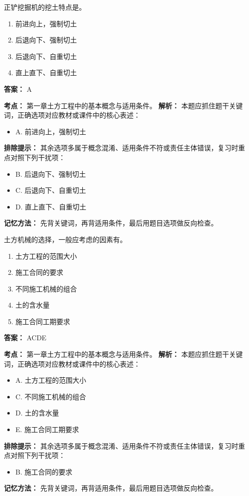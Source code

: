 \documentclass[UTF8,fontset=fandol,11pt]{ctexart}
\begin{document}
\begin{quizbox}[title={第 6 题}]
正铲挖掘机的挖土特点是。\\
\begin{enumerate}[label=\Alph*.]
\item 前进向上，强制切土
\item 后退向下、强制切土
\item 后退向下、自重切土
\item 直上直下、自重切土
\end{enumerate}
\textbf{答案：} A
\vspace{0.25em}
\begin{answerbox}[title={考点解析}]
\textbf{考点：} 第一章土方工程中的基本概念与适用条件。
\textbf{解析：} 本题应抓住题干关键词，正确选项对应教材或课件中的核心表述：
\begin{itemize}
\item A. 前进向上，强制切土
\end{itemize}
\textbf{排除提示：} 其余选项多属于概念混淆、适用条件不符或责任主体错误，复习时重点对照下列干扰项：
\begin{itemize}
\item B. 后退向下、强制切土
\item C. 后退向下、自重切土
\item D. 直上直下、自重切土
\end{itemize}
\textbf{记忆方法：} 先背关键词，再背适用条件，最后用题目选项做反向检查。
\end{answerbox}
\end{quizbox}

\begin{quizbox}[title={第 7 题}]
土方机械的选择，一般应考虑的因素有。\\
\begin{enumerate}[label=\Alph*.]
\item 土方工程的范围大小
\item 施工合同的要求
\item 不同施工机械的组合
\item 土的含水量
\item 施工合同工期要求
\end{enumerate}
\textbf{答案：} ACDE
\vspace{0.25em}
\begin{answerbox}[title={考点解析}]
\textbf{考点：} 第一章土方工程中的基本概念与适用条件。
\textbf{解析：} 本题应抓住题干关键词，正确选项对应教材或课件中的核心表述：
\begin{itemize}
\item A. 土方工程的范围大小
\item C. 不同施工机械的组合
\item D. 土的含水量
\item E. 施工合同工期要求
\end{itemize}
\textbf{排除提示：} 其余选项多属于概念混淆、适用条件不符或责任主体错误，复习时重点对照下列干扰项：
\begin{itemize}
\item B. 施工合同的要求
\end{itemize}
\textbf{记忆方法：} 先背关键词，再背适用条件，最后用题目选项做反向检查。
\end{answerbox}
\end{quizbox}
\end{document}
